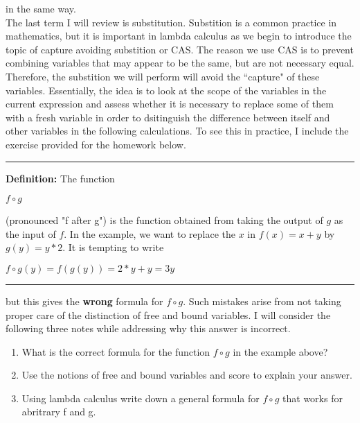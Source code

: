 \documentclass{article}
\theoremstyle{theorem}
\theoremstyle{definition}
\theoremstyle{remark}
\begin{document}
in the same way. \\ \indent The last term I will review is substitution. Substition is a common practice in mathematics, but it is important in lambda calculus as we begin to introduce the topic of capture avoiding substition or CAS. The reason we use CAS is to
prevent combining variables that may appear to be the same, but are not necessary equal. Therefore, the substition we will perform will avoid the ``capture" of these variables. Essentially, the idea is to look at the scope of the variables in the 
current expression and assess whether it is necessary to replace some of them with a fresh variable in order to dsitinguish the difference between itself and other variables in the following calculations. To see this in practice, I include the 
exercise provided for the homework below. \\

\noindent
  {\color{gray} \rule{\linewidth}{0.05mm}}
\textbf{Definition: } The function 
\begin{center}
  $f \circ g$
\end{center}
(pronounced "f after g") is the function obtained from taking the output of $g$ as the input of $f$. In the example, we want to replace the $x$ in $f(x) = x + y$ by 
$g(y) = y * 2$. It is tempting to write
\begin{center}
  $f \circ g(y) = f(g(y)) = 2 * y + y = 3y$
\end{center}
\noindent
  {\color{gray} \rule{\linewidth}{0.05mm}}
but this gives the \textbf{wrong} formula for $f \circ g$. Such mistakes arise from not taking proper care of the distinction of free and bound variables. I will consider the following three notes while addressing why this answer is incorrect. 
\begin{enumerate}
  \item What is the correct formula for the function $f \circ g$ in the example above?
  \item Use the notions of free and bound variables and score to explain your answer.
  \item Using lambda calculus write down a general formula for $f \circ g$ that works for abritrary f and g.
\end {enumerate}
\end{document}
